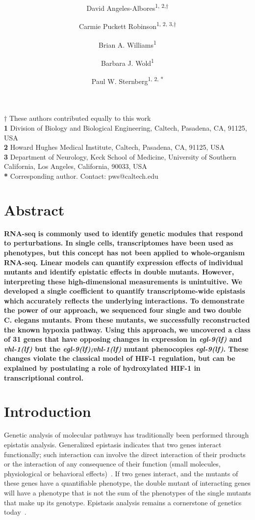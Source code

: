 \documentclass[10pt, onecolumn]{article}
\title{
  \Large
  \textbf{\titleone}
}
\author{David Angeles-Albores\textsuperscript{1, 2,$\dagger{}$}
\and{}
Carmie Puckett Robinson\textsuperscript{1, 2, 3,$\dagger{}$}
\and{}
Brian A. Williams\textsuperscript{1}
\and{}
Barbara J. Wold\textsuperscript{1}
\and{}
Paul W. Sternberg\textsuperscript{1, 2, *}
}
\newcommand{\egl}{\emph{\mbox{egl-9}(lf)}}
\newcommand{\vhl}{\emph{\mbox{vhl-1}(lf)}}
\newcommand{\eglvhl}{\emph{\mbox{egl-9(lf);vhl-1(lf)}}}
\begin{document}
\sloppy{}
\linenumbers


\maketitle
\textbf{$\dagger$} These authors contributed equally to this work\\
\textbf{1} Division of Biology and Biological Engineering, Caltech,
Pasadena, CA, 91125, USA\\
\textbf{2} Howard Hughes Medical Institute, Caltech, Pasadena, CA, 91125, USA\\
\textbf{3} Department of Neurology, Keck School of Medicine, University of
Southern California, Los Angeles, California, 90033, USA\\
\textbf{*} Corresponding author. Contact: pws@caltech.edu

\section*{Abstract}
\textbf{
RNA-seq is commonly used to identify genetic modules that respond to perturbations.
In single cells, transcriptomes have been used as phenotypes, but this concept
has not been applied to whole-organism RNA-seq. Linear models can quantify
expression effects of individual mutants and identify epistatic effects in double
mutants. However, interpreting these high-dimensional measurements is unintuitive.
We developed a single coefficient to quantify transcriptome-wide epistasis which
accurately reflects the underlying interactions. To demonstrate the power of our
approach, we sequenced four single and two double C. elegans mutants. From these
mutants, we successfully reconstructed the known hypoxia pathway. Using this
approach, we uncovered a class of 31 genes that have opposing changes in expression
in \egl{} and \vhl{} but the \eglvhl{} mutant phenocopies \egl{}.
These changes violate the classical model of HIF-1 regulation, but can be explained
by postulating a role of hydroxylated HIF-1 in transcriptional control.
}
\vspace{10mm}



\section*{Introduction}
\label{sec:introduction}
Genetic analysis of molecular pathways has traditionally been performed
through epistatis analysis. Generalized epistasis indicates that two genes interact
functionally; such interaction can involve the direct interaction of their
products or the interaction of any consequence of their function (small molecules,
physiological or behavioral effects)~\cite{Huang2006}. If two
genes interact, and the mutants of these genes have a quantifiable phenotype,
the double mutant of interacting genes will have a phenotype that is not the sum
of the phenotypes of the single mutants that make up its genotype. Epistasis
analysis remains a cornerstone of genetics today~\cite{Phillips2008}.
\end{document}
